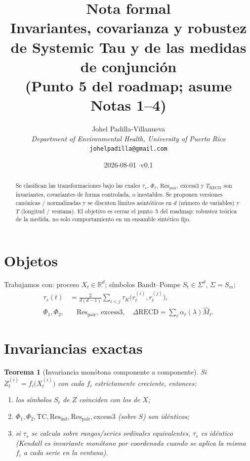 \documentclass[11pt,a4paper]{article}
\title{\textbf{Nota formal}\\[0.4em]
\large Invariantes, covarianza y robustez\\
de Systemic Tau y de las medidas de conjunci\'on\\[0.6em]
\normalsize (Punto 5 del roadmap; asume Notas 1--4)}
\author{
Johel Padilla-Villanueva\\
\textit{Department of Environmental Health, University of Puerto Rico}\\
\texttt{johelpadilla@gmail.com}
}
\date{2026-08-01 \quad$\cdot$\quad v0.1}
\theoremstyle{definition}
\theoremstyle{plain}
\newtheorem{theorem}{Teorema}[section]
\theoremstyle{remark}
\newcommand{\Res}{\mathrm{Res}}
\newcommand{\RECD}{\mathrm{RECD}}
\newcommand{\TC}{\mathrm{TC}}
\newcommand{\excess}{\mathrm{excess3}}
\newcommand{\ts}{\tau_s}
\begin{document}
\maketitle

\begin{abstract}
Se clasifican las transformaciones bajo las cuales $\ts$, $\Phi_\ell$,
$\Res_{\mathrm{pair}}$, $\excess$ y $T_{\RECD}$ son invariantes,
covariantes de forma controlada, o inestables. Se proponen versiones
can\'onicas / normalizadas y se discuten l\'imites asint\'oticos en $d$
(n\'umero de variables) y $T$ (longitud / ventana). El objetivo es
cerrar el punto~5 del roadmap: robustez te\'orica de la medida, no solo
comportamiento en un ensamble sint\'etico fijo.
\end{abstract}

\tableofcontents
\vspace{1em}

\section{Objetos}
\label{sec:obj}

Trabajamos con: proceso $X_t\in\mathbb{R}^d$; s\'imbolos Bandt--Pompe
$S_t\in\Sigma^d$, $\Sigma=S_m$;
\begin{align}
\ts(t)&=\frac{2}{d(d-1)}\sum_{i<j}\tau_K\bigl(r^{(i)}_t,r^{(j)}_t\bigr),\\
\Phi_1,\Phi_2,&\quad
\Res_{\mathrm{pair}},\ \excess,\quad
\Delta\RECD=\sum_\ell\alpha_\ell(\lambda)\widehat{M}_\ell.
\end{align}

\section{Invariancias exactas}
\label{sec:exact}

\begin{theorem}[Invariancia mon\'otona componente a componente]
\label{thm:mono}
Si $Z_t^{(i)}=f_i\bigl(X_t^{(i)}\bigr)$ con cada $f_i$
\emph{estrictamente creciente}, entonces:
\begin{enumerate}[label=(\roman*)]
  \item los s\'imbolos $S_t$ de $Z$ coinciden con los de $X$;
  \item $\Phi_1,\Phi_2,\TC,\Res_{\mathrm{ind}},\Res_{\mathrm{pair}},
  \excess$ (sobre $S$) son id\'enticos;
  \item si $\ts$ se calcula sobre rangos/series ordinales equivalentes,
  $\ts$ es id\'entico (Kendall es invariante mon\'otono por coordenada
  cuando se aplica la misma $f_i$ a cada serie en la ventana).
\end{enumerate}
\end{theorem}
\end{document}
